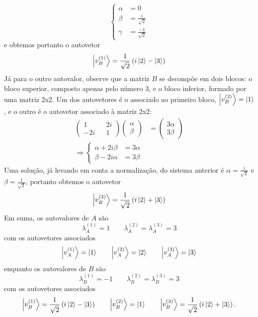 \documentclass[a4paper, 12pt, notitlepage]{article}
\begin{document}
\begin{enumerate}
\begin{enumerate}[(A)]
  \[
 \begin{cases}
    \alpha &= 0 \\
    \beta &= \frac{i}{\sqrt{2}} \\
    \gamma &= \frac{-1}{\sqrt{2}}
  \end{cases}
  \]
  \noindent e obtemos portanto o autovetor
  \[ \ket{v_B^{(1)}} = \frac{1}{\sqrt{2}} \left(i\ket{2} - \ket{3}\right) \]
  Já para o outro autovalor, observe que a matriz $B$ se decompõe em dois blocos: o bloco superior, composto apenas pelo número $3$, e o bloco inferior, formado por uma matriz 2x2. Um dos autovetores é o associado ao primeiro bloco, $\ket{v_B^{(2)}} = \ket{1}$, e o outro é o autovetor associado à matriz 2x2:
  \begin{align*}
  \begin{pmatrix}1 && 2i \\ -2i && 1\end{pmatrix} \begin{pmatrix} \alpha \\ \beta \end{pmatrix} &= \begin{pmatrix} 3\alpha \\ 3\beta \end{pmatrix} \\
  \Rightarrow \begin{cases} \alpha + 2i \beta &= 3\alpha \\
  \beta - 2i\alpha &= 3\beta \end{cases}
  \end{align*}
  Uma solução, já levando em conta a normalização, do sistema anterior é $\alpha = \frac{i}{\sqrt{2}}$ e $\beta = \frac{1}{\sqrt{2}}$, portanto obtemos o autovetor
  \[ \ket{v_B^{(3)}} = \frac{1}{\sqrt{2}} \left(i\ket{2} + \ket{3}\right) \]
  Em suma, os autovalores de $A$ são
  \[ \lambda_A^{(1)} = 1 \qquad \lambda_A^{(2)} = \lambda_A^{(3)} = 3 \]
  \noindent com os autovetores associados
  \[ \ket{v_A^{(1)}} = \ket{1} \qquad \ket{v_A^{(2)}} = \ket{2} \qquad \ket{v_A^{(3)}} = \ket{3} \]
  \noindent enquanto os autovalores de $B$ são
  \[ \lambda_B^{(1)} = -1 \qquad \lambda_B^{(2)} = \lambda_B^{(3)} = 3 \]
  \noindent com os autovetores associados
  \[ \ket{v_B^{(1)}} = \frac{1}{\sqrt{2}}\left(i\ket{2} - \ket{3}\right) \qquad \ket{v_B^{(2)}} = \ket{1} \qquad \ket{v_B^{(3)}} = \frac{1}{\sqrt{2}}\left(i\ket{2} + \ket{3}\right). \]
  

\end{enumerate}
\end{enumerate}
\end{document}
